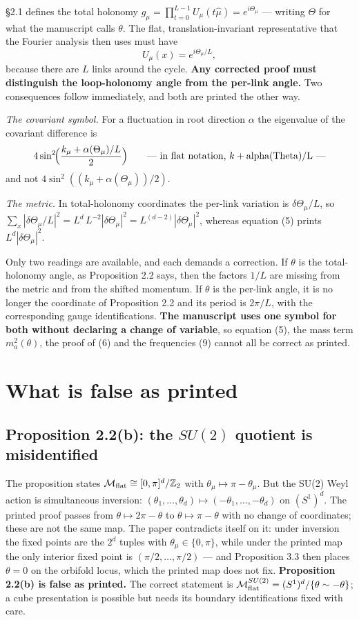\documentclass[11pt]{article}
\newcommand{\Mf}{\mathcal M_{\rm flat}}
\begin{document}
\S2.1 defines the total holonomy $g_\mu=\prod_{t=0}^{L-1}U_\mu(t\hat\mu)=e^{i\Theta_\mu}$
--- writing $\Theta$ for what the manuscript calls $\theta$. The flat,
translation-invariant representative that the Fourier analysis then uses must have
\[
U_\mu(x)=e^{i\Theta_\mu/L},
\]
because there are $L$ links around the cycle. \textbf{Any corrected proof must
distinguish the loop-holonomy angle from the per-link angle.} Two consequences follow
immediately, and both are printed the other way.

\emph{The covariant symbol.} For a fluctuation in root direction $\alpha$ the eigenvalue
of the covariant difference is
\[
4\sin^2\!\Bigl(\frac{k_\mu+\alpha(\Theta_\mu)/L}{2}\Bigr)
\qquad\text{--- in flat notation, } k + \text{alpha(Theta)/L} \text{ ---}
\]
and not $4\sin^2((k_\mu+\alpha(\Theta_\mu))/2)$.

\emph{The metric.} In total-holonomy coordinates the per-link variation is
$\delta\Theta_\mu/L$, so
$\sum_x|\delta\Theta_\mu/L|^2=L^d\,L^{-2}|\delta\Theta_\mu|^2
=L^{(d-2)}|\delta\Theta_\mu|^2$, whereas equation (5) prints
$L^d|\delta\Theta_\mu|^2$.

Only two readings are available, and each demands a correction. If $\theta$ is the
total-holonomy angle, as Proposition 2.2 says, then the factors $1/L$ are missing from
the metric and from the shifted momentum. If $\theta$ is the per-link angle, it is no
longer the coordinate of Proposition 2.2 and its period is $2\pi/L$, with the
corresponding gauge identifications. \textbf{The manuscript uses one symbol for both
without declaring a change of variable}, so equation (5), the mass term
$m_a^2(\theta)$, the proof of (6) and the frequencies (9) cannot all be correct as
printed.

\section{What is false as printed}

\subsection{Proposition 2.2(b): the $SU(2)$ quotient is misidentified}

The proposition states $\Mf\cong[0,\pi]^d/\mathbb Z_2$ with
$\theta_\mu\mapsto\pi-\theta_\mu$. But the SU(2) Weyl action is simultaneous inversion:
$(\theta_1,\dots,\theta_d)\mapsto(-\theta_1,\dots,-\theta_d)$ on $(S^1)^d$. The printed
proof passes from $\theta\mapsto2\pi-\theta$ to $\theta\mapsto\pi-\theta$ with no change
of coordinates; these are not the same map. The paper contradicts itself on it: under
inversion the fixed points are the $2^d$ tuples with $\theta_\mu\in\{0,\pi\}$, while
under the printed map the only interior fixed point is $(\pi/2,\dots,\pi/2)$ --- and
Proposition 3.3 then places $\theta=0$ on the orbifold locus, which the printed map does
not fix. \textbf{Proposition 2.2(b) is false as printed.} The correct statement is
$\Mf^{SU(2)}=(S^1)^d/\{\theta\sim-\theta\}$; a cube presentation is possible but needs
its boundary identifications fixed with care.
\end{document}
